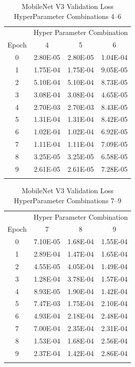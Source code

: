 \documentclass[10pt, conference]{IEEEtran}
\begin{document}
\begin{table}[H]
    \centering
    \begin{tabular}{@{}cccc@{}}
        \toprule
        & \multicolumn{3}{c}{Hyper Parameter Combination} \\
        \cmidrule{2-4}
            Epoch  & 4 & 5 & 6\\
        \midrule

        0 & 2.80E-05 & 2.80E-05 & 1.04E-04 \\
        1 & 1.75E-04 & 1.75E-04 & 9.05E-05 \\
        2 & 5.10E-04 & 5.10E-04 & 8.73E-05 \\
        3 & 3.08E-04 & 3.08E-04 & 4.65E-05 \\
        4 & 2.70E-03 & 2.70E-03 & 8.43E-05 \\
        5 & 1.31E-04 & 1.31E-04 & 8.42E-05 \\
        6 & 1.02E-04 & 1.02E-04 & 6.92E-05 \\
        7 & 1.11E-04 & 1.11E-04 & 7.09E-05 \\
        8 & 3.25E-05 & 3.25E-05 & 6.58E-05 \\
        9 & 2.61E-05 & 2.61E-05 & 7.28E-05 \\

        \bottomrule\smallskip
    \end{tabular}
    \caption{MobileNet V3 Validation Loss HyperParameter Combinations 4--6}%
    \label{table:MobileNetV3ValidationLoss4-6}
\end{table}


\begin{table}[H]
    \centering
    \begin{tabular}{@{}cccc@{}}
        \toprule
        & \multicolumn{3}{c}{Hyper Parameter Combination} \\
        \cmidrule{2-4}
            Epoch  & 7 & 8 & 9\\
        \midrule

        0 & 7.10E-05 & 1.68E-04 & 1.55E-04 \\
        1 & 2.89E-04 & 1.47E-04 & 1.65E-04 \\
        2 & 4.55E-05 & 4.05E-04 & 1.49E-04 \\
        3 & 1.28E-04 & 3.78E-04 & 1.57E-04 \\
        4 & 8.93E-05 & 1.90E-04 & 1.42E-04 \\
        5 & 7.47E-03 & 1.75E-04 & 2.10E-04 \\
        6 & 4.93E-04 & 2.18E-04 & 2.48E-04 \\
        7 & 7.00E-04 & 2.35E-04 & 2.31E-04 \\
        8 & 1.53E-04 & 1.68E-04 & 2.56E-04 \\
        9 & 2.37E-04 & 1.42E-04 & 2.86E-04 \\

        \bottomrule\smallskip
    \end{tabular}
    \caption{MobileNet V3 Validation Loss HyperParameter Combinations 7--9}%
    \label{table:MobileNetV3ValidationLoss7-9}
\end{table}



\end{document}
